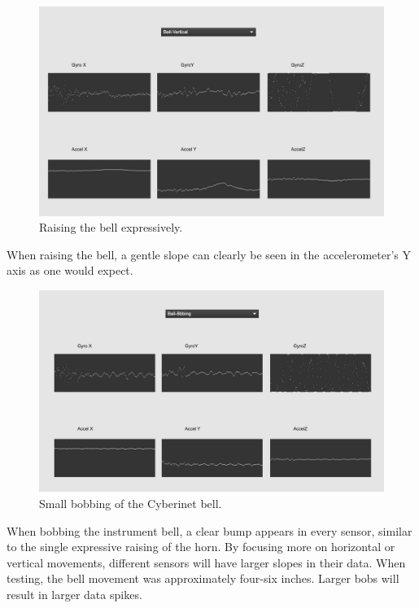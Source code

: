 \begin{figure}
    \centering
    \includegraphics[scale=0.25]{diagrams/gestureData/bellVert.png}
    \caption{Raising the bell expressively.}
    \label{fig:bellRaiseData}
\end{figure}

When raising the bell, a gentle slope can clearly be seen in the accelerometer's Y axis as one would expect. 

\begin{figure}
    \centering
    \includegraphics[scale=0.25]{diagrams/gestureData/bellBob.png}
    \caption{Small bobbing of the Cyberinet bell.}
    \label{fig:bellBobData}
\end{figure}

When bobbing the instrument bell, a clear bump appears in every sensor, similar to the single expressive raising of the horn. By focusing more on horizontal or vertical movements, different sensors will have larger slopes in their data. When testing, the bell movement was approximately four-six inches. Larger bobs will result in larger data spikes.

